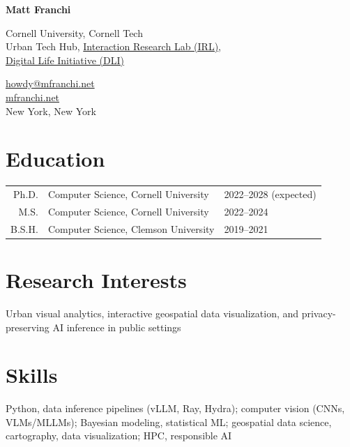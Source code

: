 \documentclass[10pt,letterpaper]{report}
\newcommand{\myname}{{Matt Franchi}}
\newcommand{\namefont}[1]{{\normalfont\bfseries\Huge{#1}}}
\begin{document}
    \pagestyle{fancy}
    \fancyhf{}
    \renewcommand{\headrulewidth}{0pt}
    \raggedright{}

    \namefont{\myname}

    \vspace{1em}
    \begin{minipage}[t]{0.6\textwidth}
         Cornell University, Cornell Tech \\ 
         Urban Tech Hub, \href{https://irl.tech.cornell.edu}{Interaction Research Lab (IRL)},\\ \href{https://dli.tech.cornell.edu}{Digital Life Initiative (DLI)}
    \end{minipage}
    \begin{minipage}[t]{0.39\textwidth}
        \flushright{}
        \href{mailto:howdy@mfranchi.net}{howdy@mfranchi.net} \\
        \href{https://mfranchi.net}{mfranchi.net} \\ 
        New York, New York
    \end{minipage}


    \section*{Education}

    \begin{tabular}{r| l l}
    Ph.D. & Computer Science, Cornell University & 2022--2028 (expected) \\
    M.S. & Computer Science, Cornell University & 2022--2024 \\
    B.S.H. & Computer Science, Clemson University & 2019--2021 \\
    \end{tabular}

    \section*{Research Interests}
    Urban visual analytics, interactive geospatial data visualization, and privacy-preserving AI inference in public settings

    \section*{Skills}

    Python, data inference pipelines (vLLM, Ray, Hydra); computer vision (CNNs, VLMs/MLLMs); Bayesian modeling, statistical ML; geospatial data science, cartography, data visualization; HPC, responsible AI
\end{document}
